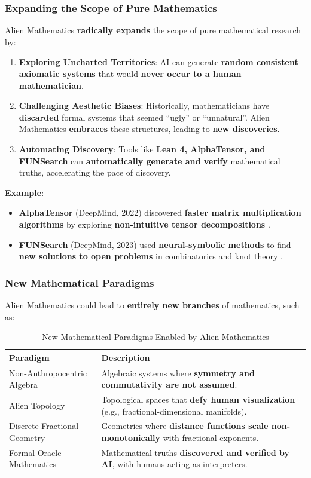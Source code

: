 \documentclass[11pt, a4paper]{article}
\begin{document}
\subsubsection{Expanding the Scope of Pure Mathematics}
Alien Mathematics \textbf{radically expands} the scope of pure mathematical research by:
\begin{enumerate}
    \item \textbf{Exploring Uncharted Territories}: AI can generate \textbf{random consistent axiomatic systems} that would \textbf{never occur to a human mathematician}.
    \item \textbf{Challenging Aesthetic Biases}: Historically, mathematicians have \textbf{discarded} formal systems that seemed “ugly” or “unnatural”. Alien Mathematics \textbf{embraces} these structures, leading to \textbf{new discoveries}.
    \item \textbf{Automating Discovery}: Tools like \textbf{Lean 4, AlphaTensor, and FUNSearch} can \textbf{automatically generate and verify} mathematical truths, accelerating the pace of discovery.
\end{enumerate}

\textbf{Example}:
\begin{itemize}
    \item \textbf{AlphaTensor} (DeepMind, 2022) discovered \textbf{faster matrix multiplication algorithms} by exploring \textbf{non-intuitive tensor decompositions} \cite{fawzi2022discovering}.
    \item \textbf{FUNSearch} (DeepMind, 2023) used \textbf{neural-symbolic methods} to find \textbf{new solutions to open problems} in combinatorics and knot theory \cite{polu2020generative}.
\end{itemize}

\subsubsection{New Mathematical Paradigms}
Alien Mathematics could lead to \textbf{entirely new branches} of mathematics, such as:

\begin{table}[h]
\centering
\caption{New Mathematical Paradigms Enabled by Alien Mathematics}
\label{tab:paradigms}
\begin{tabular}{|>{\raggedright\arraybackslash}p{4cm}|>{\raggedright\arraybackslash}p{6cm}|}
\hline
\textbf{Paradigm} & \textbf{Description} \\
\hline
Non-Anthropocentric Algebra & Algebraic systems where \textbf{symmetry and commutativity are not assumed}. \\
\hline
Alien Topology & Topological spaces that \textbf{defy human visualization} (e.g., fractional-dimensional manifolds). \\
\hline
Discrete-Fractional Geometry & Geometries where \textbf{distance functions scale non-monotonically} with fractional exponents. \\
\hline
Formal Oracle Mathematics & Mathematical truths \textbf{discovered and verified by AI}, with humans acting as interpreters. \\
\hline
\end{tabular}
\end{table}
\end{document}
